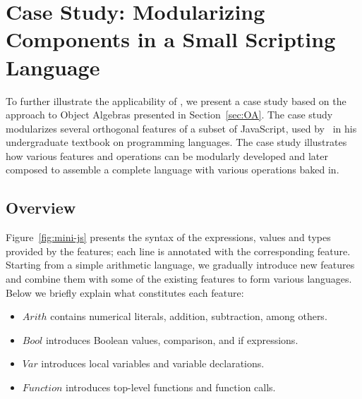 \section{Case Study: Modularizing Components in a Small Scripting Language}

To further illustrate the applicability of \name, we present a case study based
on the approach to Object Algebras presented in Section~\ref{sec:OA}. The case
study modularizes several orthogonal features of a subset of JavaScript, used
by~\citet{poplcook} in his undergraduate textbook on programming languages. The
case study illustrates how various features and operations can be modularly
developed and later composed to assemble a complete language with various
operations baked in.



\subsection{Overview}

Figure~\ref{fig:mini-js} presents the syntax of the expressions, values and
types provided by the features; each line is annotated with the corresponding
feature. Starting from a simple arithmetic language, we gradually introduce new
features and combine them with some of the existing features to form various
languages. Below we briefly explain what constitutes each feature:
\begin{itemize}
\item $\mathit{Arith}$ contains numerical literals, addition, subtraction, among
  others.
\item $\mathit{Bool}$ introduces Boolean values, comparison, and if expressions.
\item $\mathit{Var}$ introduces local variables and variable declarations.
\item $\mathit{Function}$ introduces top-level functions and function calls.
\end{itemize}

